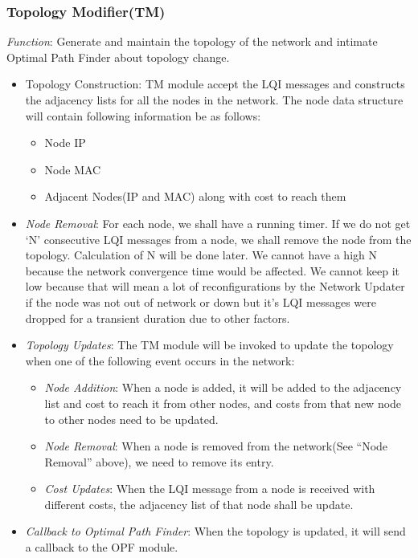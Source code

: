 \documentclass{article}
\begin{document}
\subsubsection{Topology Modifier(TM)}
\textit{Function}: Generate and maintain the topology of the network and intimate Optimal Path Finder about topology change.
\begin{itemize}
\item Topology Construction: TM module accept the LQI messages and constructs the adjacency lists for all the nodes in
the network. The node data structure will contain following information be as follows:
\begin{itemize}
\item Node IP
\item Node MAC
\item Adjacent Nodes(IP and MAC) along with cost to reach them
\end{itemize}
\item \textit{Node Removal}: For each node, we shall have a running timer. If we do not get ‘N’ consecutive LQI messages from a
node, we shall remove the node from the topology. Calculation of N will be done later. We cannot have a high N because
the network convergence time would be affected. We cannot keep it low because that will mean a lot of reconfigurations
by the Network Updater if the node was not out of network or down but it’s LQI messages were dropped for a transient
duration due to other factors.
\item \textit{Topology Updates}: The TM module will be invoked to update the topology when one of the following event occurs in
the network:
\begin{itemize}
\item \textit{Node Addition}: When a node is added, it will be added to the adjacency list and cost to reach it from other nodes,
and costs from that new node to other nodes need to be updated.
\item \textit{Node Removal}: When a node is removed from the network(See “Node Removal” above), we need to remove its entry.
\item \textit{Cost Updates}: When the LQI message from a node is received with different costs, the adjacency list of that node
shall be update.
\end{itemize}
\item \textit{Callback to Optimal Path Finder}: When the topology is updated, it will send a callback to the OPF module.
\end{itemize}
\end{document}
